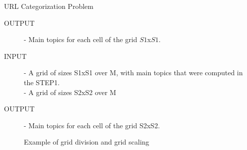 \documentclass[final]{beamer}
\newlength{\onecolwid}
\begin{document}
\begin{frame}[t]
\begin{columns}[t]
\begin{column}{\onecolwid}
\begin{block}{URL Categorization Problem}
\begin{description}
		\item [OUTPUT] - Main topics for each cell of the grid $S1$x$S1$.\\
	\end{description}
		
\begin{description}
		\item [INPUT] - A grid of sizes S1xS1 over M, with main topics that were computed in the STEP1.\\
					  - A grid of sizes S2xS2 over M

					  
		\item [OUTPUT] - Main topics for each cell of the grid S2xS2.\\
	\end{description}	

\end{block}


\begin{figure}[h]
	\caption{Example of grid division and grid scaling}
\end{figure}


\end{column}
\end{columns}
\end{frame}
\end{document}
